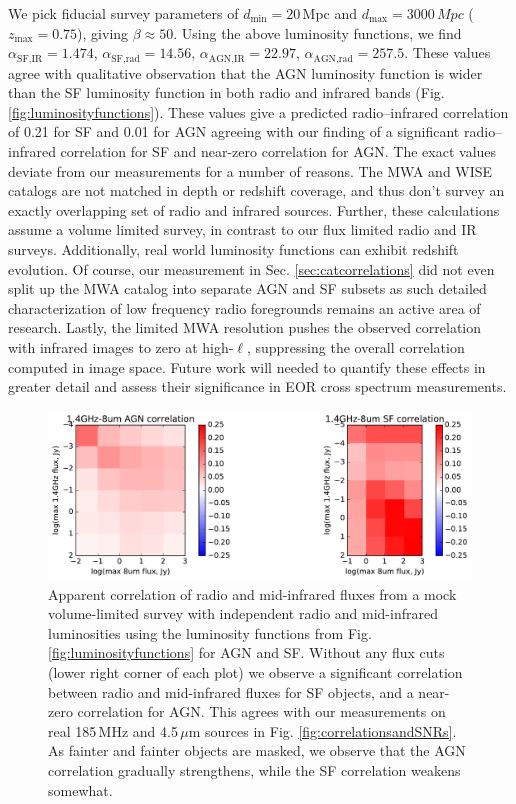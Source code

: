 \documentclass[numberedappendix]{emulateapj}
\newcommand{\mintext}{\text{min}}
\newcommand{\maxtext}{\text{max}}
\begin{document}
We pick fiducial survey parameters of $d_\mintext=20$\,Mpc and $d_\maxtext=3000\,Mpc$ ($z_\maxtext=0.75$), giving $\beta\approx50$.  Using the above luminosity functions, we find $\alpha_{\text{SF,IR}}=1.474$, $\alpha_{\text{SF,rad}}=14.56$, $\alpha_{\text{AGN,IR}}=22.97$, $\alpha_{\text{AGN,rad}}=257.5$. These values agree with qualitative observation that the AGN luminosity function is wider than the SF luminosity function in both radio and infrared bands (Fig. \ref{fig:luminosityfunctions}). These values give a predicted radio--infrared correlation of 0.21 for SF and 0.01 for AGN agreeing with our finding of a significant radio--infrared correlation for SF and near-zero correlation for AGN. The exact values deviate from our measurements for a number of reasons. The MWA and WISE catalogs are not matched in depth or redshift coverage, and thus don't survey an exactly overlapping set of radio and infrared sources. Further, these calculations assume a volume limited survey, in contrast to our flux limited radio and IR surveys. Additionally, real world luminosity functions can exhibit redshift evolution. Of course, our measurement in Sec. \ref{sec:catcorrelations} did not even split up the MWA catalog into separate AGN and SF subsets as such detailed characterization of low frequency radio foregrounds remains an active area of research. Lastly, the limited MWA resolution pushes the observed correlation with infrared images to zero at high-$\ell$, suppressing the overall correlation computed in image space. Future work will needed to quantify these effects in greater detail and assess their significance in EOR cross spectrum measurements.

\begin{figure}[h]
\centering
\includegraphics[width=6in]{sim_correlation_agn_and_sf.pdf}
\caption[Apparent correlation of radio and mid-infrared fluxes from a mock survey.]{Apparent correlation of radio and mid-infrared fluxes from a mock volume-limited survey with independent radio and mid-infrared luminosities using the luminosity functions from Fig. \ref{fig:luminosityfunctions} for AGN and SF. Without any flux cuts (lower right corner of each plot) we observe a significant correlation between radio and mid-infrared fluxes for SF objects, and a near-zero correlation for AGN. This agrees with our measurements on real 185\,MHz and 4.5\,$\mu$m sources in Fig. \ref{fig:correlationsandSNRs}. As fainter and fainter objects are masked, we observe that the AGN correlation gradually strengthens, while the SF correlation weakens somewhat. }
\label{fig:simagnlfcorrelations}
\end{figure}
\end{document}
